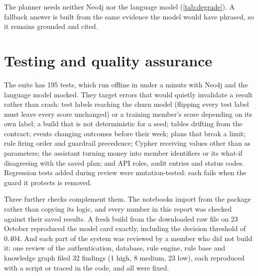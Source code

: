 The planner needs neither Neo4j nor the language model (\cref{tab:degrade}). A fallback answer is built from the same evidence the model would have phrased, so it remains grounded and cited.

\section{Testing and quality assurance}

The suite has 195 tests, which run offline in under a minute with Neo4j and the language model mocked. They target errors that would quietly invalidate a result rather than crash: test labels reaching the churn model (flipping every test label must leave every score unchanged) or a training member's score depending on its own label; a build that is not deterministic for a seed; tables drifting from the contract; events changing outcomes before their week; plans that break a limit; rule firing order and guardrail precedence; Cypher receiving values other than as parameters; the assistant turning money into member identifiers or its what-if disagreeing with the saved plan; and API roles, audit entries and status codes. Regression tests added during review were mutation-tested: each fails when the guard it protects is removed.

Three further checks complement them. The notebooks import from the package rather than copying its logic, and every number in this report was checked against their saved results. A fresh build from the downloaded raw file on 23 October reproduced the model card exactly, including the decision threshold of 0.404. And each part of the system was reviewed by a member who did not build it: one review of the authentication, database, rule engine, rule base and knowledge graph filed 32 findings (1 high, 8 medium, 23 low), each reproduced with a script or traced in the code, and all were fixed.
